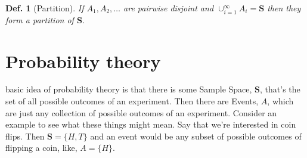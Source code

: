 \documentclass{tufte-book}
\theoremstyle{mytheoremstyle}
\theoremstyle{mylemstyle}
\theoremstyle{mydefstyle}
\newtheorem*{mydef}{Def.}
\begin{document}
	\begin{mydef}[Partition]
		If \(A_1, A_2, \dots\) are pairwise disjoint and \(\cup_{i = 1}^\infty A_i = \mathbf{S}\) then they form a partition of \(\mathbf{S}\).
	\end{mydef}

\section{Probability theory}
 basic idea of probability theory is that there is some Sample Space, \(\mathbf{S}\), that's the set of all possible outcomes of an experiment. Then there are Events, \(A\), which are just any collection of possible outcomes of an experiment. Consider an example to see what these things might mean. Say that we're interested in coin flips. Then \(\mathbf{S} = \{H, T\}\) and an event would be any subset of possible outcomes of flipping a coin, like, \(A = \{H\}\). 
\end{document}
